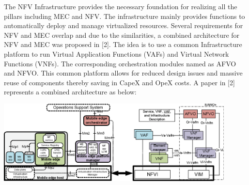 \documentclass[../seminar.tex]{subfiles}
\begin{document}
	
	The NFV Infrastructure provides the necessary foundation for realizing all the pillars including MEC and NFV. The infrastructure mainly provides functions to automatically deploy and manage virtualized resources. Several requirements for NFV and MEC overlap and due to the similarities, a combined architecture for NFV and MEC was proposed in [2]. The idea is to use a common Infrastructure platform to run Virtual Application Functions (VAFs) and Virtual Network Functions (VNFs). The corresponding orchestration modules named as AFVO and NFVO. This common platform allows for reduced design issues and massive reuse of components thereby saving in CapeX and OpeX costs. A paper in [2] represents a combined architecture as below:
	
\includegraphics[width=0.9\textwidth]{images/combined_architecture}
	
\end{document}
